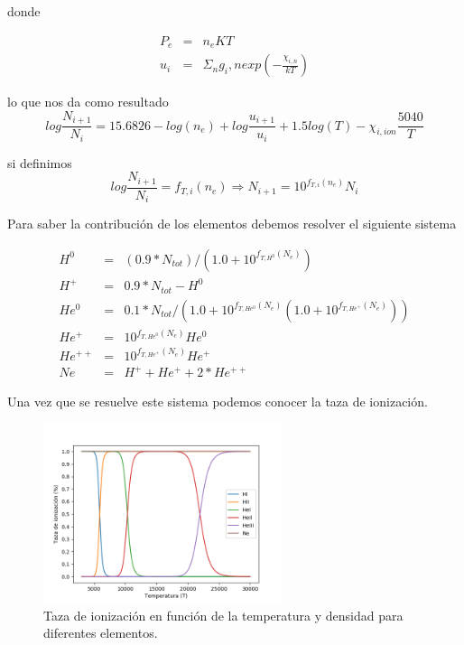 \documentclass[a4paper]{article}
\begin{document}
donde

\begin{eqnarray*}
P_e &=& n_e KT\\
u_i &=& \Sigma_n g_i, n exp \left( -\frac{\chi_{i,n}}{kT} \right)
\end{eqnarray*}

lo que nos da como resultado 
\begin{equation*}
    log\frac{N_{i+1}}{N_i} = 15.6826 - log(n_e) + log\frac{u_{i+1}}{u_i} + 1.5 log(T) - \chi_{i, ion} \frac{5040}{T}
\end{equation*}

si definimos 
    $$log\frac{N_{i+1}}{N_i} = f_{T,i}(n_e) \Rightarrow N_{i+1} = 10^{f_{T,i}(n_e)} N_i$$

Para saber la contribución de los elementos debemos resolver el siguiente sistema

\begin{eqnarray*}
H^0  &=&  (0.9 * N_{tot}) / (1.0 + 10^{f_{T,H^0}(N_e)} )\\
H^+  &=&  0.9 * N_{tot} - H^0\\
He^0 &=&  0.1 * N_{tot} / (1.0 + 10^{f_{T,He^0}(N_e)}(1.0 + 10^{f_{T,He^+}(N_e)}))\\
He^+ &=&  10^{f_{T,He^0}(N_e)} He^0\\
He^{++} &=& 10^{f_{T,He^+}(N_e)} He^+ \\
Ne   &=& H^+ + He^+ + 2*He^{++} 
\end{eqnarray*}

Una vez que se resuelve este sistema podemos conocer la taza de ionización.

\begin{figure}[!htbp]
\begin{center}
\includegraphics[width=7cm]{saha.png}
\end{center}
\caption{Taza de ionización en función de la temperatura y densidad para diferentes elementos.}\label{saha}
\end{figure}

\newpage
\end{document}
